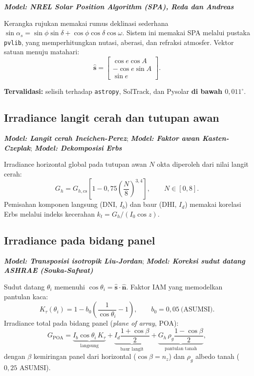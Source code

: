 \documentclass[11pt,a4paper]{article}
\newcommand{\nhat}{\hat{\bm{n}}}
\newcommand{\shat}{\hat{\bm{s}}}
\newcommand{\degg}{^\circ}
\newcommand{\model}[1]{\textbf{\textit{Model: #1}}}
\begin{document}
\model{NREL Solar Position Algorithm (SPA), Reda dan Andreas}

Kerangka rujukan memakai rumus deklinasi sederhana
$\sin\alpha_s = \sin\phi\sin\delta + \cos\phi\cos\delta\cos\omega$. Sistem ini memakai SPA melalui pustaka
\texttt{pvlib}, yang memperhitungkan nutasi, aberasi, dan refraksi atmosfer. Vektor satuan menuju matahari:
\begin{equation}
\shat = \begin{bmatrix} \cos e \cos A \\ -\cos e \sin A \\ \sin e \end{bmatrix}.
\end{equation}

\textbf{Tervalidasi:} selisih terhadap \texttt{astropy}, SolTrack, dan Pysolar \textbf{di bawah
$0{,}011\degg$}.

\subsection{Irradiance langit cerah dan tutupan awan}

\model{Langit cerah Ineichen-Perez}; \model{Faktor awan Kasten-Czeplak}; \model{Dekomposisi Erbs}

Irradiance horizontal global pada tutupan awan $N$ okta diperoleh dari nilai langit cerah:
\begin{equation}
G_h = G_{h,\mathrm{cs}} \left[ 1 - 0{,}75 \left( \frac{N}{8} \right)^{3{,}4} \right],
\qquad N \in [0,8].
\end{equation}
Pemisahan komponen langsung (DNI, $I_b$) dan baur (DHI, $I_d$) memakai korelasi Erbs melalui indeks
kecerahan $k_t = G_h / (I_{0}\cos z)$.

\subsection{Irradiance pada bidang panel}

\model{Transposisi isotropik Liu-Jordan}; \model{Koreksi sudut datang ASHRAE (Souka-Safwat)}

Sudut datang $\theta_i$ memenuhi $\cos\theta_i = \shat \cdot \nhat$. Faktor IAM yang memodelkan pantulan kaca:
\begin{equation}
K_\tau(\theta_i) = 1 - b_0 \left( \frac{1}{\cos\theta_i} - 1 \right), \qquad b_0 = 0{,}05 \ \text{(ASUMSI)}.
\end{equation}
Irradiance total pada bidang panel (\emph{plane of array}, POA):
\begin{equation}
G_{\mathrm{POA}} = \underbrace{I_b \cos\theta_i\, K_\tau}_{\text{langsung}}
+ \underbrace{I_d \frac{1 + \cos\beta}{2}}_{\text{baur langit}}
+ \underbrace{G_h\, \rho_g \frac{1 - \cos\beta}{2}}_{\text{pantulan tanah}},
\label{eq:poa}
\end{equation}
dengan $\beta$ kemiringan panel dari horizontal ($\cos\beta = n_z$) dan $\rho_g$ albedo tanah
($0{,}25$ ASUMSI).
\end{document}
